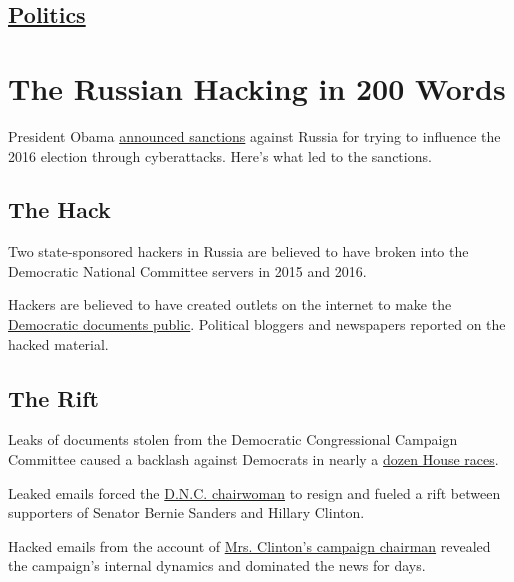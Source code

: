 \hypertarget{-politics-}{%
\subsection{\texorpdfstring{ \href{/section/politics}{Politics}
}{ Politics }}\label{-politics-}}

\hypertarget{the-russian-hacking-in-200-words}{%
\section{The Russian Hacking in 200
Words}\label{the-russian-hacking-in-200-words}}

President Obama
\href{https://www.nytimes3xbfgragh.onion/2016/12/29/us/politics/russia-election-hacking-sanctions.html}{announced
sanctions} against Russia for trying to influence the 2016 election
through cyberattacks. Here's what led to the sanctions.

\hypertarget{the-hack}{%
\subsection{The Hack}\label{the-hack}}

Two state-sponsored hackers in Russia are believed to have broken into
the Democratic National Committee servers in 2015 and 2016.

Hackers are believed to have created outlets on the internet to make the
\href{https://www.nytimes3xbfgragh.onion/2016/12/09/us/obama-russia-election-hack.html}{Democratic
documents public}. Political bloggers and newspapers reported on the
hacked material.

\hypertarget{the-rift}{%
\subsection{The Rift}\label{the-rift}}

Leaks of documents stolen from the Democratic Congressional Campaign
Committee caused a backlash against Democrats in nearly a
\href{https://www.nytimes3xbfgragh.onion/2016/12/13/us/politics/house-democrats-hacking-dccc.html}{dozen
House races}.

Leaked emails forced the
\href{https://www.nytimes3xbfgragh.onion/2016/07/25/us/politics/debbie-wasserman-schultz-dnc-wikileaks-emails.html}{D.N.C.
chairwoman} to resign and fueled a rift between supporters of Senator
Bernie Sanders and Hillary Clinton.

Hacked emails from the account of
\href{https://www.nytimes3xbfgragh.onion/2016/10/12/us/politics/hillary-clinton-emails-wikileaks.html?_r=0}{Mrs.
Clinton's campaign chairman} revealed the campaign's internal dynamics
and dominated the news for days.

